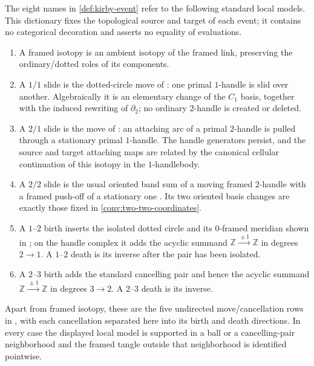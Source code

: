 \begin{convention}
\label{conv:referenced-kirby-dictionary}
The eight names in \cref{def:kirby-event} refer to the following standard
local models.  This dictionary fixes the topological source and target of
each event; it contains no categorical decoration and asserts no equality of
evaluations.
\begin{enumerate}[label=(\roman*),ref=\roman*]
  \item A framed isotopy is an ambient isotopy of the framed link, preserving
  the ordinary/dotted roles of its components.

  \item A $1/1$ slide is the dotted-circle move of
  \cite[Figure~5.39]{GompfStipsicz1999}: one primal $1$-handle is slid over
  another.  Algebraically it is an elementary change of the $C_1$ basis,
  together with the induced rewriting of $\partial_2$; no ordinary
  $2$-handle is created or deleted.

  \item A $2/1$ slide is the move of
  \cite[Figure~5.36]{GompfStipsicz1999}: an attaching arc of a primal
  $2$-handle is pulled through a stationary primal $1$-handle.  The handle
  generators persist, and the source and target attaching maps are related by
  the canonical cellular continuation of this isotopy in the $1$-handlebody.

  \item A $2/2$ slide is the usual oriented band sum of a moving framed
  $2$-handle with a framed push-off of a stationary one
  \cite[Section~5.1]{GompfStipsicz1999}.  Its two oriented basis changes are
  exactly those fixed in \cref{conv:two-two-coordinates}.

  \item A $1$--$2$ birth inserts the isolated dotted circle and its
  $0$-framed meridian shown in
  \cite[Figure~5.38]{GompfStipsicz1999}; on the handle complex it adds the
  acyclic summand $\mathbb Z\xrightarrow{\,\pm1\,}\mathbb Z$ in degrees
  $2\to1$.  A $1$--$2$ death is its inverse after the pair has been isolated.

  \item A $2$--$3$ birth adds the standard cancelling pair and hence the
  acyclic summand $\mathbb Z\xrightarrow{\,\pm1\,}\mathbb Z$ in degrees
  $3\to2$.  A $2$--$3$ death is its inverse.
\end{enumerate}
Apart from framed isotopy, these are the five undirected move/cancellation
rows in \cite[Table~2]{BarenzBarrett2018}, with each cancellation separated
here into its birth and death directions.  In every case the displayed local model
is supported in a ball or a cancelling-pair neighborhood and the framed
tangle outside that neighborhood is identified pointwise.
\end{convention}

